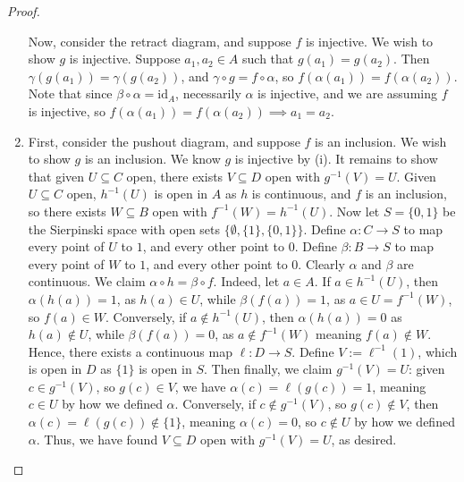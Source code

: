 \documentclass{amsart}
\theoremstyle{plain}
\theoremstyle{definition}
\newcommand{\sseq}{\subseteq}
\newcommand{\0}{\mathbf{0}}
\newcommand{\id}{\mathrm{id}}
\renewcommand{\(}{\left(}
\renewcommand{\)}{\right)}
\begin{document}
\begin{proof}
\begin{enumerate}[label=(\roman*),listparindent=\parindent,parsep=0pt]
    Now, consider the retract diagram, and suppose $f$ is injective. We wish to show $g$ is injective. Suppose $a_1,a_2\in A$ such that $g(a_1)=g(a_2)$. Then $\gamma(g(a_1))=\gamma(g(a_2))$, and $\gamma\circ g=f\circ\alpha$, so $f(\alpha(a_1))=f(\alpha(a_2))$. Note that since $\beta\circ\alpha=\id_A$, necessarily $\alpha$ is injective, and we are assuming $f$ is injective, so $f(\alpha(a_1))=f(\alpha(a_2))\implies a_1=a_2$.
    \item First, consider the pushout diagram, and suppose $f$ is an inclusion. We wish to show $g$ is an inclusion. We know $g$ is injective by (i). It remains to show that given $U\sseq C$ open, there exists $V\sseq D$ open with $g^{-1}(V)=U$. Given $U\sseq C$ open, $h^{-1}(U)$ is open in $A$ as $h$ is continuous, and $f$ is an inclusion, so there exists $W\sseq B$ open with $f^{-1}(W)=h^{-1}(U)$. Now let $S=\{0,1\}$ be the Sierpinski space with open sets $\{\emptyset,\{1\},\{0,1\}\}$. Define $\alpha:C\to S$ to map every point of $U$ to $1$, and every other point to $0$. Define $\beta:B\to S$ to map every point of $W$ to $1$, and every other point to $0$. Clearly $\alpha$ and $\beta$ are continuous. We claim $\alpha\circ h=\beta\circ f$. Indeed, let $a\in A$. If $a\in h^{-1}(U)$, then $\alpha(h(a))=1$, as $h(a)\in U$, while $\beta(f(a))=1$, as $a\in U=f^{-1}(W)$, so $f(a)\in W$. Conversely, if $a\notin h^{-1}(U)$, then $\alpha(h(a))=0$ as $h(a)\notin U$, while $\beta(f(a))=0$, as $a\notin f^{-1}(W)$ meaning $f(a)\notin W$. Hence, there exists a continuous map $\ell:D\to S$. Define $V:=\ell^{-1}(1)$, which is open in $D$ as $\{1\}$ is open in $S$. Then finally, we claim $g^{-1}(V)=U$: given $c\in g^{-1}(V)$, so $g(c)\in V$, we have $\alpha(c)=\ell(g(c))=1$, meaning $c\in U$ by how we defined $\alpha$. Conversely, if $c\notin g^{-1}(V)$, so $g(c)\notin V$, then $\alpha(c)=\ell(g(c))\notin\{1\}$, meaning $\alpha(c)=0$, so $c\notin U$ by how we defined $\alpha$. Thus, we have found $V\sseq D$ open with $g^{-1}(V)=U$, as desired.
    

\end{enumerate}
\end{proof}
\end{document}
